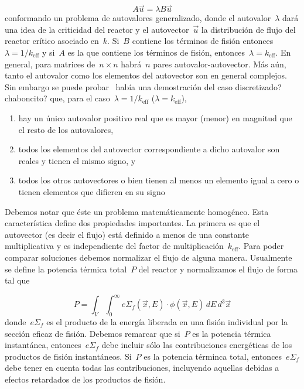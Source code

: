 \begin{equation}
 A \vec{u} = \lambda B \vec{u}
\end{equation}
%
conformando un problema de autovalores generalizado, donde el autovalor~$\lambda$ dará una idea de la criticidad del reactor y el autovector~$\vec{u}$ la distribución de flujo del reactor crítico asociado en~$k$.
Si~$B$ contiene los términos de fisión entonces~$\lambda = 1/k_\text{eff}$ y si~$A$ es la que contiene los términos de fisión, entonces~$\lambda = k_\text{eff}$.
En general, para matrices de~$n \times n$ habrá~$n$ pares autovalor-autovector. Más aún, tanto el autovalor como los elementos del autovector son en general complejos. 
Sin embargo se puede probar~\cite{henry} {\color{red}había una demostración del caso discretizado? chaboncito?} que, para el caso~$\lambda=1/k_\text{eff}$ ($\lambda=k_\text{eff}$), 

\begin{enumerate}\label{enum:properties}
 \item hay un único autovalor positivo real que es mayor (menor) en magnitud que el resto de los autovalores,
 \item todos los elementos del autovector correspondiente a dicho autovalor son reales y tienen el mismo signo, y
 \item todos los otros autovectores o bien tienen al menos un elemento igual a cero o tienen elementos que difieren en su signo
\end{enumerate}

\medskip

Debemos notar que éste un problema matemáticamente homogéneo. Esta característica define dos propiedades importantes. La primera es que el autovector (es decir el flujo) está definido a menos de una constante multiplicativa y es independiente del factor de multiplicación~$k_\text{eff}$. Para poder comparar soluciones debemos normalizar el flujo de alguna manera. Usualmente se define la potencia térmica total~$P$ del reactor y normalizamos el flujo de forma tal que

\begin{equation*}
 P = \int_{V} \int_0^\infty e\Sigma_f(\vec{x}, E) \cdot \phi(\vec{x}, E) \, dE \, d^3\vec{x}
\end{equation*}
%
donde~$e\Sigma_f$ es el producto de la energía liberada en una fisión individual por la sección eficaz de fisión. Debemos remarcar que si~$P$ es la potencia térmica instantánea, entonces~$e\Sigma_f$ debe incluir sólo las contribuciones energéticas de los productos de fisión instantáneos. Si~$P$ es la potencia términca total, entonces~$e\Sigma_f$ debe tener en cuenta todas las contribuciones, incluyendo aquellas debidas a efectos retardados de los productos de fisión.

